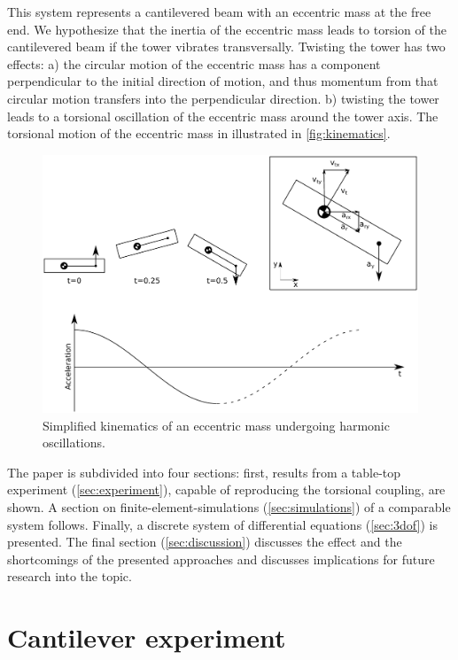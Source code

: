 \documentclass{article}
\begin{document}
This system represents a cantilevered beam with an eccentric mass at the free end. We hypothesize that the inertia of the eccentric mass leads to torsion of the cantilevered beam if the tower vibrates transversally. Twisting the tower has two effects: a) the circular motion of the eccentric mass has a component perpendicular to the initial direction of motion, and thus momentum from that circular motion transfers into the perpendicular direction. b) twisting the tower leads to a torsional oscillation of the eccentric mass around the tower axis. The torsional motion of the eccentric mass in illustrated in \autoref{fig:kinematics}.

\clearpage

\begin{figure}[ht!]
    \centering
    \includegraphics[width=0.7\linewidth]{manuscript/figures/kinematics.pdf}
    \caption{Simplified kinematics of an eccentric mass undergoing harmonic oscillations.}
    \label{fig:kinematics}
\end{figure}

The paper is subdivided into four sections: first, results from a table-top experiment (\autoref{sec:experiment}), capable of reproducing the torsional coupling, are shown. A section on finite-element-simulations (\autoref{sec:simulations}) of a comparable system follows. Finally, a discrete system of differential equations (\autoref{sec:3dof}) is presented. The final section (\autoref{sec:discussion}) discusses the effect and the shortcomings of the presented approaches and discusses implications for future research into the topic. 

\clearpage

\section{Cantilever experiment}
\label{sec:experiment}
\end{document}
